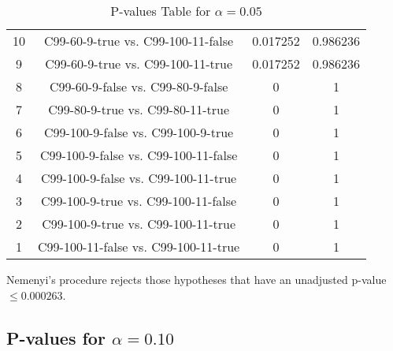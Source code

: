 \documentclass[a4paper,10pt]{article}
\begin{document}
\begin{landscape}
\begin{table}[!htp]
\begin{tabular}{cccc}
10&C99-60-9-true vs. C99-100-11-false&0.017252&0.986236\\
9&C99-60-9-true vs. C99-100-11-true&0.017252&0.986236\\
8&C99-60-9-false vs. C99-80-9-false&0&1\\
7&C99-80-9-true vs. C99-80-11-true&0&1\\
6&C99-100-9-false vs. C99-100-9-true&0&1\\
5&C99-100-9-false vs. C99-100-11-false&0&1\\
4&C99-100-9-false vs. C99-100-11-true&0&1\\
3&C99-100-9-true vs. C99-100-11-false&0&1\\
2&C99-100-9-true vs. C99-100-11-true&0&1\\
1&C99-100-11-false vs. C99-100-11-true&0&1\\
\hline
\end{tabular}
\caption{P-values Table for $\alpha=0.05$}
\end{table}Nemenyi's procedure rejects those hypotheses that have an unadjusted p-value $\le0.000263$.

\pagebreak

\subsection{P-values for $\alpha=0.10$}


\end{landscape}
\end{document}
